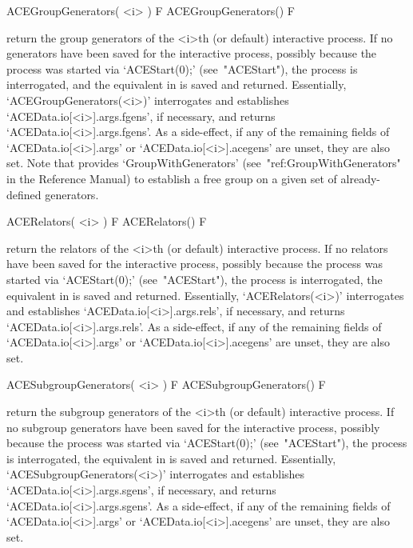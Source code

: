 
\>ACEGroupGenerators( <i> ) F
\>ACEGroupGenerators() F

return  the  {\GAP}  group  generators  of  the  <i>th  (or   default)
interactive {\ACE} process. If no generators have been saved  for  the
interactive {\ACE} process, possibly because the process  was  started
via   `ACEStart(0);'   (see~"ACEStart"),   the   {\ACE}   process   is
interrogated, and the equivalent in  {\GAP}  is  saved  and  returned.
Essentially,   `ACEGroupGenerators(<i>)'   interrogates   {\ACE}   and
establishes `ACEData.io[<i>].args.fgens', if  necessary,  and  returns
`ACEData.io[<i>].args.fgens'.  As  a  side-effect,  if  any   of   the
remaining       fields       of       `ACEData.io[<i>].args'        or
`ACEData.io[<i>].acegens' are unset, they  are  also  set.  Note  that
{\GAP} provides  `GroupWithGenerators'  (see~"ref:GroupWithGenerators"
in the {\GAP} Reference Manual) to establish a free group on  a  given
set of already-defined generators.

\>ACERelators( <i> ) F
\>ACERelators() F

return the {\GAP} relators  of  the  <i>th  (or  default)  interactive
{\ACE} process. If no relators have been  saved  for  the  interactive
{\ACE}  process,  possibly  because  the  process  was   started   via
`ACEStart(0);' (see~"ACEStart"), the {\ACE} process  is  interrogated,
the  equivalent  in  {\GAP}  is  saved  and   returned.   Essentially,
`ACERelators(<i>)'     interrogates     {\ACE}     and     establishes
`ACEData.io[<i>].args.rels',     if     necessary,     and     returns
`ACEData.io[<i>].args.rels'. As a side-effect, if any of the remaining
fields  of  `ACEData.io[<i>].args'  or  `ACEData.io[<i>].acegens'  are
unset, they are also set.

\>ACESubgroupGenerators( <i> ) F
\>ACESubgroupGenerators() F

return the {\GAP}  subgroup  generators  of  the  <i>th  (or  default)
interactive {\ACE} process. If no subgroup generators have been  saved
for the interactive {\ACE} process, possibly because the  process  was
started via `ACEStart(0);' (see~"ACEStart"),  the  {\ACE}  process  is
interrogated,  the  equivalent  in  {\GAP}  is  saved  and   returned.
Essentially,  `ACESubgroupGenerators(<i>)'  interrogates  {\ACE}   and
establishes `ACEData.io[<i>].args.sgens', if  necessary,  and  returns
`ACEData.io[<i>].args.sgens'.  As  a  side-effect,  if  any   of   the
remaining       fields       of       `ACEData.io[<i>].args'        or
`ACEData.io[<i>].acegens' are unset, they are also set.

